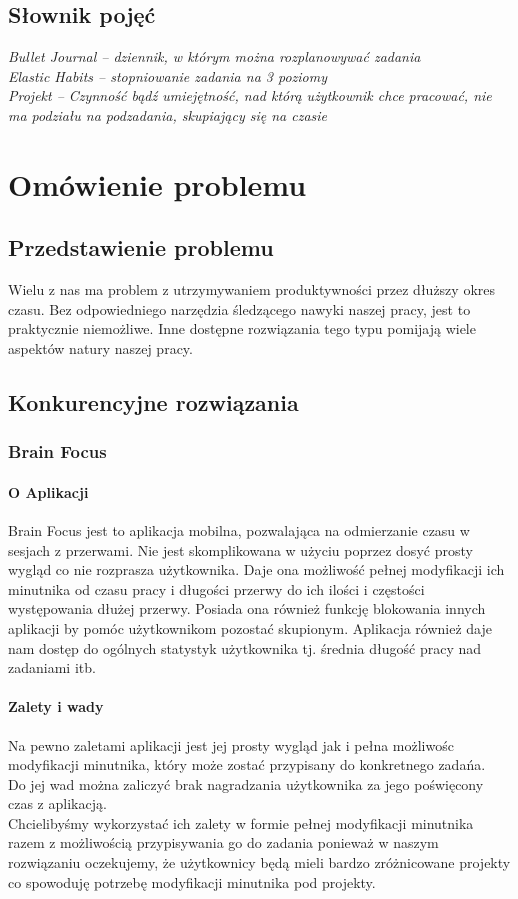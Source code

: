 \documentclass[a4paper,11pt]{report}
\begin{document}
\section {Słownik pojęć}
	\emph{Bullet Journal – dziennik, w którym można rozplanowywać zadania}\\
	\emph{Elastic Habits – stopniowanie zadania na 3 poziomy}\\
	\emph{Projekt – Czynność bądź umiejętność, nad którą użytkownik chce pracować, nie ma podziału na podzadania, skupiający się na czasie}

\chapter {Omówienie problemu}
\section {Przedstawienie problemu}
Wielu z nas ma problem z utrzymywaniem produktywności przez dłuższy okres czasu. Bez odpowiedniego narzędzia śledzącego nawyki naszej pracy, jest to praktycznie niemożliwe. Inne dostępne rozwiązania tego typu pomijają wiele aspektów natury naszej pracy.

\section {Konkurencyjne rozwiązania}
\subsection{Brain Focus}
\subsubsection{O Aplikacji}
Brain Focus jest to aplikacja mobilna, pozwalająca na odmierzanie czasu w sesjach z przerwami. Nie jest skomplikowana w użyciu poprzez dosyć prosty wygląd co nie rozprasza użytkownika. Daje ona możliwość pełnej modyfikacji ich minutnika od czasu pracy i długości przerwy do ich ilości i częstości występowania dłużej przerwy. Posiada ona również funkcję blokowania innych aplikacji by pomóc użytkownikom pozostać skupionym. Aplikacja również daje nam dostęp do ogólnych statystyk użytkownika tj. średnia długość pracy nad zadaniami itb.
\subsubsection{Zalety i wady}
Na pewno zaletami aplikacji jest jej prosty wygląd jak i pełna możliwośc modyfikacji minutnika, który może zostać przypisany do konkretnego zadańa. \vspace{0,5cm}\\Do jej wad można zaliczyć brak nagradzania użytkownika za jego poświęcony czas z aplikacją.
\vspace{0,5cm}\\Chcielibyśmy wykorzystać ich zalety w formie pełnej modyfikacji minutnika razem z możliwością przypisywania go do zadania ponieważ w naszym rozwiązaniu oczekujemy, że użytkownicy będą mieli bardzo zróżnicowane projekty co spowoduję potrzebę modyfikacji minutnika pod projekty.
\end{document}
